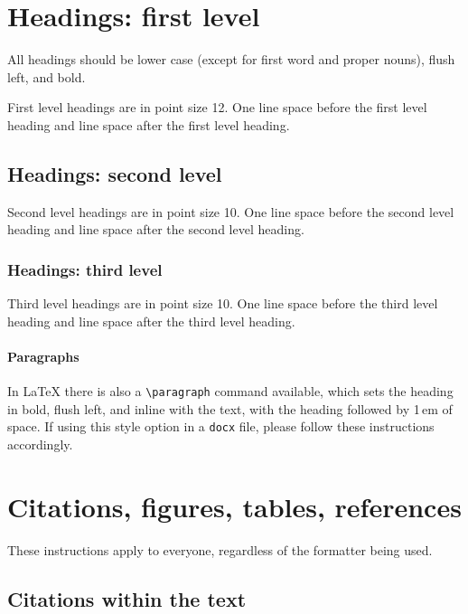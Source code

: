 \documentclass{article}
\begin{document}
\section{Headings: first level}
\label{headings}

All headings should be lower case (except for first word and proper nouns),
flush left, and bold.

First level headings are in point size 12. One line space before the first level heading and  line space after the first level heading.

\subsection{Headings: second level}

Second level headings are in point size 10. One line space before the second level heading and  line space after the second level heading.

\subsubsection{Headings: third level}

Third level headings are in point size 10. One line space before the third level heading and  line space after the third level heading. 

\paragraph{Paragraphs}

In \LaTeX{} there is also a \verb+\paragraph+ command available, which sets the heading in bold, flush left, and inline with the text, with the heading followed by 1\,em of space. If using this style option in a \verb+docx+ file, please follow these instructions accordingly.

\section{Citations, figures, tables, references}
\label{others}

These instructions apply to everyone, regardless of the formatter being used.

\subsection{Citations within the text}
\end{document}

